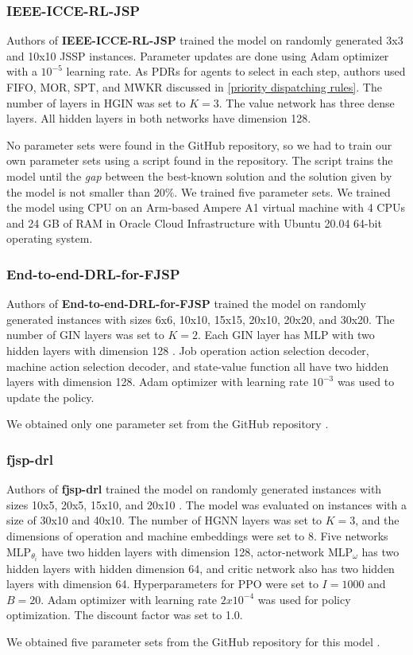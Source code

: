 \subsubsection{IEEE-ICCE-RL-JSP}
Authors of \textbf{IEEE-ICCE-RL-JSP} trained the model on randomly generated 3x3 and 10x10 JSSP instances. Parameter updates are done using Adam optimizer with a $10^{-5}$ learning rate. As PDRs for agents to select in each step, authors used FIFO, MOR, SPT, and MWKR discussed in \ref{priority dispatching rules}. The number of layers in HGIN was set to $K=3$. The value network has three dense layers. All hidden layers in both networks have dimension 128.
\par
No parameter sets were found in the GitHub repository\cite{github_IEEE-ICCE-RL-JSP}, so we had to train our own parameter sets using a script found in the repository. The script trains the model until the \textit{gap} between the best-known solution and the solution given by the model is not smaller than 20$\%$. We trained five parameter sets. We trained the model using CPU on an Arm-based Ampere A1 virtual machine with 4 CPUs and 24 GB of RAM in Oracle Cloud Infrastructure with Ubuntu 20.04 64-bit operating system.

\subsubsection{End-to-end-DRL-for-FJSP}
Authors of \textbf{End-to-end-DRL-for-FJSP} trained the model on randomly generated instances with sizes 6x6, 10x10, 15x15, 20x10, 20x20, and 30x20. The number of GIN layers was set to $K = 2$. Each GIN layer has MLP with two hidden layers with dimension 128 \cite{LEI2022117796}. Job operation action selection decoder, machine action selection decoder, and state-value function all have two hidden layers with dimension 128. Adam optimizer with learning rate $10^{-3}$ was used to update the policy.
\par
We obtained only one parameter set from the GitHub repository \cite{github_end_to_end_drl_for_fjsp}.

\subsubsection{fjsp-drl}
Authors of \textbf{fjsp-drl} trained the model on randomly generated instances with sizes 10x5, 20x5, 15x10, and 20x10 \cite{9826438}. The model was evaluated on instances with a size of 30x10 and 40x10. The number of HGNN layers was set to $K = 3$, and the dimensions of operation and machine embeddings were set to 8. Five networks $\text{MLP}_{\theta_i}$ have two hidden layers with dimension 128, actor-network $\text{MLP}_\omega$ has two hidden layers with hidden dimension 64, and critic network also has two hidden layers with dimension 64. Hyperparameters for PPO were set to $I = 1000$ and $B = 20$. Adam optimizer with learning rate $2x10^{-4}$ was used for policy optimization. The discount factor was set to 1.0.
\par
We obtained five parameter sets from the GitHub repository for this model \cite{github_fjsp-drl}.

